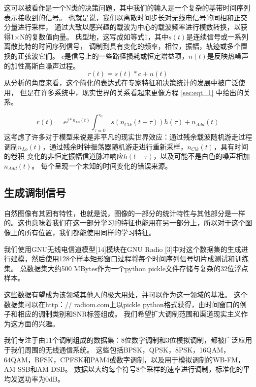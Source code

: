 这可以被看作是一个N类的决策问题，其中我们的输入是一个复杂的基带时间序列表示接收到的信号。
也就是说，我们以离散时间步长对无线电信号的同相和正交分量进行采样，
通过大致以感兴趣的载波为中心的载波频率进行模数转换，以获得1×N的复数值向量。
典型地，这写成如等式1，其中$s(t)$是连续信号或一系列离散比特的时间序列信号，
调制到具有变化的频率，相位，振幅，轨迹或多个置换的正弦波它们。
 $c$是信号上的一些路径损耗或恒定增益项，$n(t)$是反映热噪声的加性高斯白噪声过程。
\begin{equation}\label{sec:eqt_1}
r(t) = s(t)*c + n(t)
\end{equation}
从分析的角度来看，这个简化的表达式在专家特征和决策统计的发展中被广泛使用，
但是在许多系统中，现实世界的关系看起来更像方程 \ref{sec:eqt_1} 中给出的关系。\par
\begin{equation}
	r(t) = e^{j*n_{Lo}(t)} \int_{\tau=0}^{\tau_{0}} s(n_{Clk}(t-\tau))h(\tau) + n_{Add}(t)
\end{equation}
这考虑了许多对于模型来说是非平凡的现实世界效应：通过残余载波随机游走过程调制$n_{Lo}(t)$，通过残余时钟振荡器随机游走进行重新采样，$n_{Clk}(t)$，具有时间的卷积 变化的非恒定振幅信道脉冲响应$h(t-\tau)$，以及可能不是白色的噪声相加$n_{Add}(t)$。 每个呈现一个未知的时间变化的错误来源。\par



\subsection{生成调制信号}
自然图像有其固有特性，也就是说，图像的一部分的统计特性与其他部分是一样的。这也意味着我们在这一部分学习的特征也能用在另一部分上，所以对于这个图像上的所有位置，我们都能使用同样的学习特征。

我们使用GNU无线电信道模型[14]模块在GNU Radio [3]中对这个数据集的生成进行建模，然后使用128个样本矩形窗口过程将每个时间序列信号切片成测试和训练集。 总数据集大约500 MBytes作为一个python pickle文件存储与复杂的32位浮点样本。\par

这些数据有望成为该领域其他人的极大用处，并可以作为这一领域的基准。 这个数据集可以在http：// radiom.com上以pickle python格式获得，由时间窗口的例子和相应的调制类别和SNR标签组成。 我们希望扩大调制范围和渠道现实主义作为这方面的兴趣。\par

我们专注于由11个调制组成的数据集：8位数字调制和3位模拟调制，都被广泛应用于我们周围的无线通信系统。 这些包括BPSK，QPSK，8PSK，16QAM，64QAM，BFSK，CPFSK和PAM4或数字调制，以及用于模拟调制的WB-FM，AM-SSB和AM-DSB。 数据以大约每个符号8个采样的速率进行调制，标准化的平均发送功率为0dB。\par

